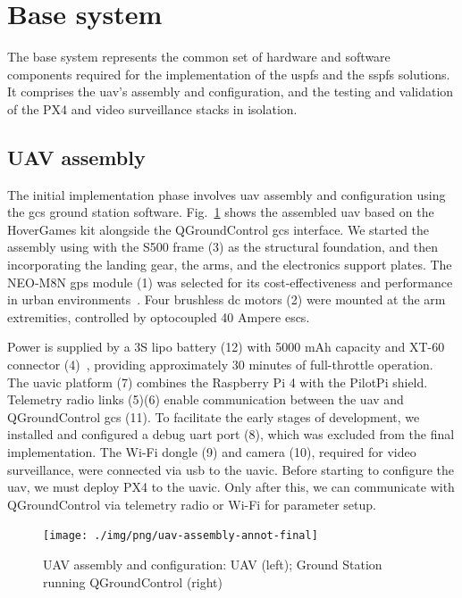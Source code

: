 \section{Base system}
\label{sec:base-system}
The base system represents the common set of hardware and software components
required for the implementation of the \gls{uspfs} and the \gls{sspfs}
solutions. It comprises the \gls{uav}'s assembly and configuration, and the
testing and validation of the PX4 and video surveillance stacks in isolation.

\subsection{UAV assembly}
\label{sec:uav-assembly}
The initial implementation phase involves \gls{uav} assembly and configuration
using the \gls{gcs} ground station software. Fig.~\ref{fig:uav-assembly}
shows the assembled \gls{uav} based on the HoverGames kit alongside the
QGroundControl \gls{gcs} interface.
%
We started the assembly using with the S500 frame (3) as the structural
foundation, and then incorporating the landing gear, the arms, and the electronics support plates. The NEO-M8N
\gls{gps} module (1) was selected for its cost-effectiveness and performance in
urban environments~\cite{gps-neom8n-product}. Four brushless \gls{dc} motors (2)
were mounted at the arm extremities, controlled by optocoupled 40 Ampere \glspl{esc}.

Power is supplied by a 3S \gls{lipo} battery (12) with 5000 mAh capacity and
XT-60 connector (4)~\cite{lipo-3s-uav}, providing approximately 30 minutes of
full-throttle operation. The \gls{uavic} platform (7) combines the Raspberry Pi
4 with the PilotPi shield. Telemetry radio links (5)(6) enable communication
between the \gls{uav} and QGroundControl \gls{gcs} (11). To facilitate
the early stages of development, we installed and configured a
debug \gls{uart} port (8), which was excluded from the final implementation. The
Wi-Fi dongle (9) and camera (10), required for video surveillance, were
connected via \gls{usb} to the \gls{uavic}.
%
Before starting to configure the \gls{uav}, we must deploy PX4 to the
\gls{uavic}. Only after this, we can communicate with QGroundControl via telemetry radio or Wi-Fi for parameter setup.

\begin{figure}[!hbt]
  \centering
  \texttt{[image: ./img/png/uav-assembly-annot-final]} 
  \caption[UAV assembly and configuration]{UAV assembly and configuration: UAV
    (left); Ground Station running QGroundControl (right)}%
  \label{fig:uav-assembly}
\end{figure}


